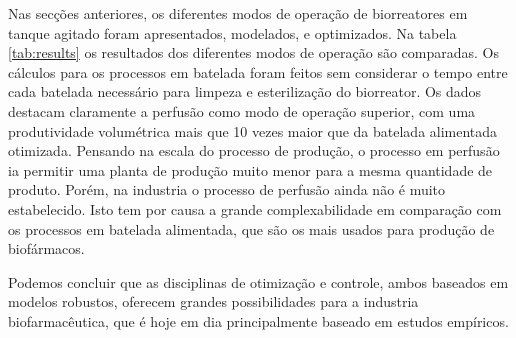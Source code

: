 \documentclass[fleqn,10pt]{SelfArx} %
\begin{document}
Nas secções anteriores, os diferentes modos de operação de biorreatores em tanque agitado foram apresentados, modelados, e optimizados. Na tabela \ref{tab:results} os resultados dos diferentes modos de operação são comparadas. Os cálculos para os processos em batelada foram feitos sem considerar o tempo entre cada batelada necessário para limpeza e esterilização do biorreator. Os dados destacam claramente a perfusão como modo de operação superior, com uma produtividade volumétrica mais que 10 vezes maior que da batelada alimentada otimizada. Pensando na escala do processo de produção, o processo em perfusão ia permitir uma planta de produção muito menor para a mesma quantidade de produto. Porém, na industria o processo de perfusão ainda não é muito estabelecido. Isto tem por causa a grande complexabilidade em comparação com os processos em batelada alimentada, que são os mais usados para produção de biofármacos.

Podemos concluir que as disciplinas de otimização e controle, ambos baseados em modelos robustos, oferecem grandes possibilidades para a industria biofarmacêutica, que é hoje em dia principalmente baseado em estudos empíricos.
\end{document}
